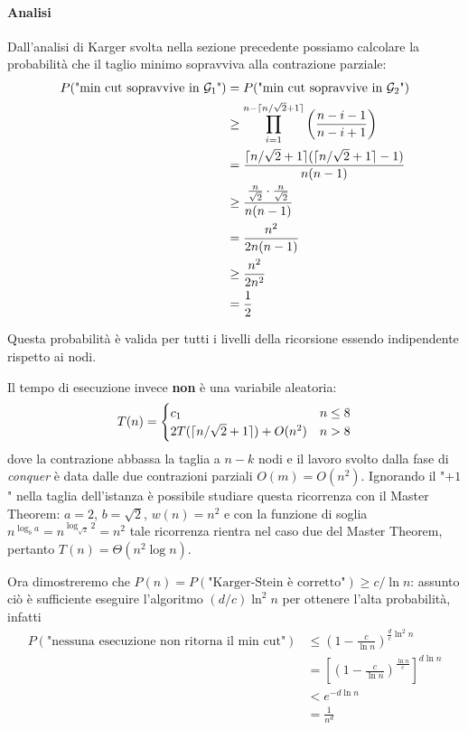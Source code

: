 \paragraph*{Analisi}
Dall'analisi di Karger svolta nella sezione precedente possiamo calcolare la probabilità che il taglio minimo sopravviva alla contrazione parziale:
\begin{align*}
P(\text{"min cut sopravvive in }\mathcal{G}_1\text{"})&=P(\text{"min cut sopravvive in }\mathcal{G}_2\text{"}) \\
&\geq \prod_{i=1}^{n-\lceil n/\sqrt{2}+1\rceil} \left( \frac{n-i-1}{n-i+1} \right) \\
&=\frac{\lceil n/\sqrt{2}+1\rceil(\lceil n/\sqrt{2}+1\rceil-1)}{n(n-1)} \\
&\geq \frac{\frac{n}{\sqrt{2}}\cdot\frac{n}{\sqrt{2}}}{n(n-1)} \\
&=\frac{n^2}{2n(n-1)} \\
&\geq \frac{n^2}{2n^2} \\
&=\frac{1}{2}
\end{align*}

Questa probabilità è valida per tutti i livelli della ricorsione essendo indipendente rispetto ai nodi.

Il tempo di esecuzione invece \textbf{non} è una variabile aleatoria:
\[
T(n)=\begin{cases}
c_1 & n\leq 8 \\
2T(\lceil n/\sqrt{2}+1\rceil) + O(n^2) & n>8
\end{cases}
\]
dove la contrazione abbassa la taglia a $n-k$ nodi e il lavoro svolto dalla fase di \textit{conquer} è data dalle due contrazioni parziali $O(m)=O(n^2)$.
Ignorando il "$+1$" nella taglia dell'istanza è possibile studiare questa ricorrenza con il Master Theorem: $a=2$, $b=\sqrt{2}$, $w(n)=n^2$ e con la funzione di soglia $n^{\log_b{a}}=n^{\log_{\sqrt{2}}{2}}=n^2$ tale ricorrenza rientra nel caso due del Master Theorem, pertanto $T(n)=\Theta(n^2\log n)$.

Ora dimostreremo che $P(n)=P(\text{"Karger-Stein è corretto"})\geq c/\ln n$: assunto ciò è sufficiente eseguire l'algoritmo $(d/c)\ln^2 n$ per ottenere l'alta probabilità, infatti
\begin{align*}
P(\text{"nessuna esecuzione non ritorna il min cut"})&\leq \left(1-\frac{c}{\ln n}\right)^{\frac{d}{c}\ln^2 n }\\
&=\left[\left(1-\frac{c}{\ln n}\right)^\frac{\ln n}{c}\right]^{d\ln n} \\
&<e^{-d\ln n} \\
&=\frac{1}{n^d}
\end{align*}

